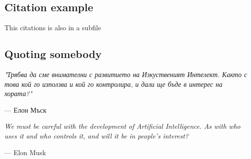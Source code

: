 \documentclass{subfiles}
\begin{document}
\subsection{Citation example}
This citations is also in a subfile \cite{some_reference}

\subsection{Quoting somebody}

\epigraph{\itshape "Трябва да сме внимателни с развитието на Изкуственият Интелект. Както с това кой го използва и кой го контролира, и дали ще бъде в интерес на хората?"}{--- Елон Мъск}

\epigraph{\itshape We must be careful with the development of Artificial Intelligence. As with who uses it and who controls it, and
will it be in people's interest?}{--- Elon Musk}
\end{document}
